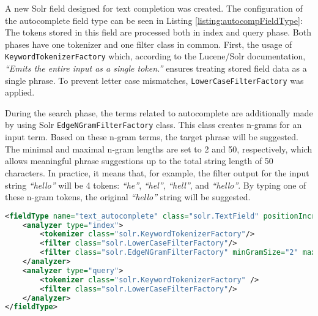 A new Solr field designed for text completion was created.
The configuration of the autocomplete field type can be seen in Listing \ref{listing:autocompFieldType}:
The tokens stored in this field are processed both in index and query phase.
Both phases have one tokenizer and one filter class in common.
First, the usage of \texttt{KeywordTokenizerFactory} which, according to the Lucene/Solr documentation, \textit{``Emits the entire input as a single token.''} ensures treating stored field data as a single phrase.
To prevent letter case mismatches, \texttt{LowerCaseFilterFactory} was applied.


During the search phase, the terms related to autocomplete are additionally made by using Solr \texttt{EdgeNGramFilterFactory} class. This class creates n-grams for an input term.
Based on these n-gram terms, the target phrase will be suggested.
The minimal and maximal n-gram lengths are set to 2 and 50, respectively, which allows meaningful phrase suggestions up to the total string length of 50 characters.
In practice, it means that, for example, the filter output for the input string \textit{``hello''} will be 4 tokens: \textit{``he''}, \textit{``hel''}, \textit{``hell''}, and \textit{``hello''}. By typing one of these n-gram tokens, the original \textit{``hello''} string will be suggested.

\begin{lstlisting}[language=XML, caption={Autocomplete Field Type.}, label={listing:autocompFieldType}]
<fieldType name="text_autocomplete" class="solr.TextField" positionIncrementGap="100">
	<analyzer type="index">
		<tokenizer class="solr.KeywordTokenizerFactory"/>
		<filter class="solr.LowerCaseFilterFactory"/>
		<filter class="solr.EdgeNGramFilterFactory" minGramSize="2" maxGramSize="50" />
	</analyzer>
	<analyzer type="query">
		<tokenizer class="solr.KeywordTokenizerFactory" />
		<filter class="solr.LowerCaseFilterFactory"/>
	</analyzer>
</fieldType>
\end{lstlisting}


